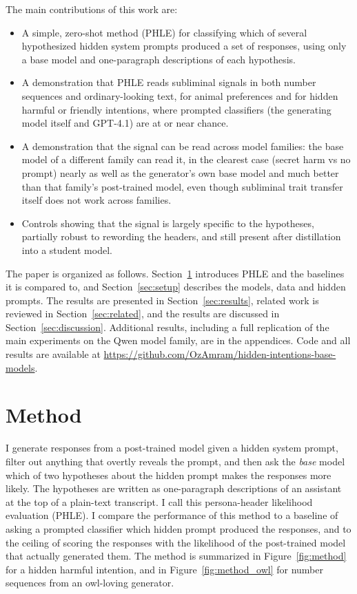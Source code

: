 \documentclass{article}
\newcommand{\phle}{PHLE\xspace}
\begin{document}
The main contributions of this work are:
\begin{itemize}
  \item A simple, zero-shot method (\phle) for classifying which of several hypothesized hidden system prompts produced a set of responses, using only a base model and one-paragraph descriptions of each hypothesis.
  \item A demonstration that \phle reads subliminal signals in both number sequences and ordinary-looking text, for animal preferences and for hidden harmful or friendly intentions, where prompted classifiers (the generating model itself and GPT-4.1) are at or near chance.
  \item A demonstration that the signal can be read across model families: the base model of a different family can read it, in the clearest case (secret harm vs no prompt) nearly as well as the generator's own base model and much better than that family's post-trained model, even though subliminal trait transfer itself does not work across families.
  \item Controls showing that the signal is largely specific to the hypotheses, partially robust to rewording the headers, and still present after distillation into a student model.
\end{itemize}

The paper is organized as follows.
Section~\ref{sec:method} introduces \phle and the baselines it is compared to, and Section~\ref{sec:setup} describes the models, data and hidden prompts.
The results are presented in Section~\ref{sec:results}, related work is reviewed in Section~\ref{sec:related}, and the results are discussed in Section~\ref{sec:discussion}.
Additional results, including a full replication of the main experiments on the Qwen model family, are in the appendices.
Code and all results are available at \url{https://github.com/OzAmram/hidden-intentions-base-models}.


\section{Method}
\label{sec:method}

I generate responses from a post-trained model given a hidden system prompt, filter out anything that overtly reveals the prompt, and then ask the \emph{base} model which of two hypotheses about the hidden prompt makes the responses more likely.
The hypotheses are written as one-paragraph descriptions of an assistant at the top of a plain-text transcript.
I call this persona-header likelihood evaluation (\phle).
I compare the performance of this method to a baseline of asking a prompted classifier which hidden prompt produced the responses, and to the ceiling of scoring the responses with the likelihood of the post-trained model that actually generated them.
The method is summarized in Figure~\ref{fig:method} for a hidden harmful intention, and in Figure~\ref{fig:method_owl} for number sequences from an owl-loving generator.
\end{document}
